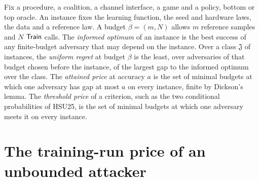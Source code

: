 \begin{definition}
Fix a procedure, a coalition, a channel interface, a game and a policy, bottom or
top oracle. An instance fixes the learning function, the seed and hardware laws, the
data and a reference law. A budget $\beta=(m,N)$ allows $m$ reference samples and $N$
$\mathsf{Train}$ calls. The \emph{informed optimum} of an instance is the best success of
any finite-budget adversary that may depend on the instance. Over a class $\mathfrak J$
of instances, the \emph{uniform regret} at budget $\beta$ is the least, over adversaries
of that budget chosen before the instance, of the largest gap to the informed optimum
over the class. The \emph{attained price} at accuracy $a$ is the set of minimal budgets
at which one adversary has gap at most $a$ on every instance, finite by Dickson's
lemma. The \emph{threshold price} of a criterion, such as the two conditional
probabilities of HSU25, is the set of minimal budgets at which one adversary meets it
on every instance.
\end{definition}

\section{The training-run price of an unbounded attacker}

